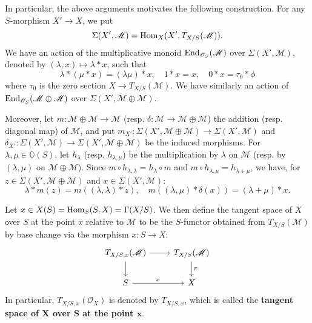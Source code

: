 \begin{remark}\label{scheme tangent bundle Sigma action construction}
In particular, the above arguments motivates the following construction. For any $S$-morphism $X'\to X$, we put
\[\Sigma(X',\mathscr{M})=\mathrm{Hom}_X(X',T_{X/S}(\mathscr{M})).\]
We have an action of the multiplicative monoid $\mathrm{End}_{\mathscr{O}_S}(\mathscr{M})$ over $\Sigma(X',\mathscr{M})$, denoted by $(\lambda,x)\mapsto\lambda\ast x$, such that
\begin{equation}\label{scheme tangent bundle Sigma action construction-1}
\lambda\ast(\mu\ast x)=(\lambda\mu)\ast x,\quad 1\ast x=x,\quad 0\ast x=\tau_0\ast\phi
\end{equation}
where $\tau_0$ is the zero section $X\to T_{X/S}(\mathscr{M})$. We have similarly an action of $\mathrm{End}_{\mathscr{O}_S}(\mathscr{M}\oplus\mathscr{M})$ over $\Sigma(X',\mathscr{M}\oplus\mathscr{M})$.\par
Moreover, let $m:\mathscr{M}\oplus\mathscr{M}\to\mathscr{M}$ (resp. $\delta:\mathscr{M}\to\mathscr{M}\oplus\mathscr{M}$) the addition (resp. diagonal map) of $\mathscr{M}$, and put $m_{X'}:\Sigma(X',\mathscr{M}\oplus\mathscr{M})\to\Sigma(X',\mathscr{M})$ and $\delta_{X'}:\Sigma(X',\mathscr{M})\to\Sigma(X',\mathscr{M}\oplus\mathscr{M})$ be the induced morphisms. For $\lambda,\mu\in\mathbb{O}(S)$, let $h_\lambda$ (resp. $h_{\lambda,\mu}$) be the multiplication by $\lambda$ on $\mathscr{M}$ (resp. by $(\lambda,\mu)$ on $\mathscr{M}\oplus\mathscr{M}$). Since $m\circ h_{\lambda,\lambda}=h_\lambda\circ m$ and $m\circ h_{\lambda,\mu}=h_{\lambda+\mu}$, we have, for $z\in\Sigma(X',\mathscr{M}\oplus\mathscr{M})$ and $x\in\Sigma(X',\mathscr{M})$:
\begin{equation}\label{scheme tangent bundle Sigma action construction-2}
\lambda\ast m(z)=m((\lambda,\lambda)\ast z),\quad m((\lambda,\mu)\ast\delta(x))=(\lambda+\mu)\ast x.
\end{equation}
\end{remark}

\begin{definition}
Let $x\in X(S)=\mathrm{Hom}_S(S,X)=\Gamma(X/S)$. We then define the tangent space of $X$ over $S$ at the point $x$ relative to $\mathscr{M}$ to be the $S$-functor obtained from $T_{X/S}(\mathscr{M})$ by base change via the morphism $x:S\to X$:
\[\begin{tikzcd}
T_{X/S,x}(\mathscr{M})\ar[r]\ar[d]&T_{X/S}(\mathscr{M})\ar[d,"\pi"]\\
S\ar[r,"x"]&X
\end{tikzcd}\]
In particular, $T_{X/S,x}(\mathscr{O}_X)$ is denoted by $T_{X/S,x}$, which is called the \textbf{tangent space of $\bm{X}$ over $\bm{S}$ at the point $\bm{x}$}.
\end{definition}


